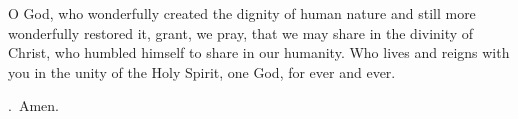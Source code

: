 \lettrine[lines=3]{O}{} God, who wonderfully created the dignity of human nature
and still more wonderfully restored it,
grant, we pray,
that we may share in the divinity of Christ,
who humbled himself to share in our humanity.
Who lives and reigns with you in the unity of the Holy Spirit,
one God, for ever and ever. \par \Rbar.~Amen.
